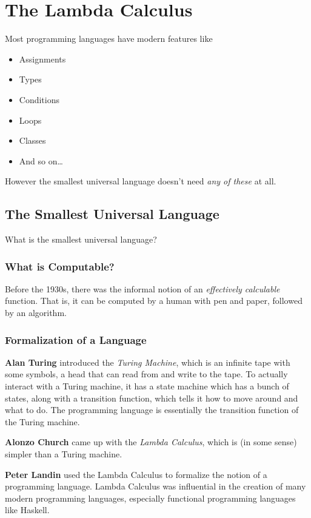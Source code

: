 \documentclass[letterpaper]{article}
\begin{document}
\section{The Lambda Calculus}
Most programming languages have modern features like 
\begin{itemize}
    \item Assignments
    \item Types
    \item Conditions
    \item Loops
    \item Classes
    \item And so on\dots
\end{itemize}

However the smallest universal language doesn't need \emph{any of these} at all.

\subsection{The Smallest Universal Language}
What is the smallest universal language?

\subsubsection{What is Computable?}
Before the 1930s, there was the informal notion of an \emph{effectively calculable} function. That is, it can be computed by a human with pen and paper, followed by an algorithm. 

\subsubsection{Formalization of a Language}
\textbf{Alan Turing} introduced the \emph{Turing Machine}, which is an infinite tape with some symbols, a head that can read from and write to the tape. To actually interact with a Turing machine, it has a state machine which has a bunch of states, along with a transition function, which tells it how to move around and what to do. The programming language is essentially the transition function of the Turing machine. 

\bigskip 

\textbf{Alonzo Church} came up with the \emph{Lambda Calculus}, which is (in some sense) simpler than a Turing machine. 

\bigskip 

\textbf{Peter Landin} used the Lambda Calculus to formalize the notion of a programming language. Lambda Calculus was influential in the creation of many modern programming languages, especially functional programming languages like Haskell. 
\end{document}
